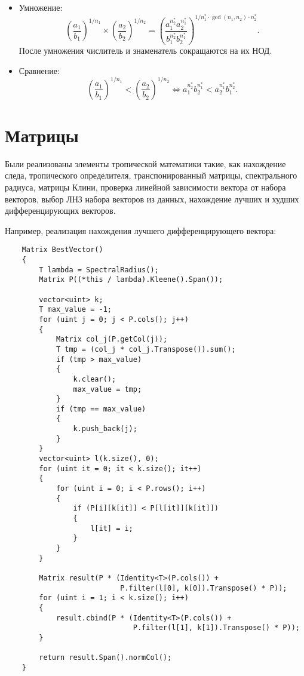 \documentclass[specialist, substylefile = spbureport.rtx,
    subf,href,colorlinks=true, 12pt]{disser}
\begin{document}
    \begin{itemize}
        \item Умножение:
        $$ \left(\frac{a_1}{b_1}\right)^{1/n_1} \times \left(\frac{a_2}{b_2}\right)^{1/n_2} = \left(\frac{a_1^{n^*_2}a_2^{n^*_1}}{b_1^{n^*_2}b_2^{n^*_1}}\right)^{1/n^*_1\cdot \gcd(n_1, n_2) \cdot n^*_2}.$$
        После умножения числитель и знаменатель сокращаются на их НОД.
        \item Сравнение:
        $$ \left(\frac{a_1}{b_1}\right)^{1/n_1} < \left(\frac{a_2}{b_2}\right)^{1/n_2} \Leftrightarrow
        {a_1^{n^*_2}}{b_2^{n^*_1}} < {a_2^{n^*_1}}{b_1^{n^*_2}}.$$
    \end{itemize}

    




    \section{Матрицы}
    Были реализованы элементы тропической математики такие, как нахождение следа, тропического определителя, транспонированный матрицы, спектрального радиуса, матрицы Клини, проверка линейной зависимости вектора от набора векторов, выбор ЛНЗ набора векторов из данных, нахождение лучших и худших дифференцирующих векторов.


    Например, реализация нахождения лучшего дифференцирующего вектора:
    \begin{lstlisting}
    Matrix BestVector()
    {
        T lambda = SpectralRadius();
        Matrix P((*this / lambda).Kleene().Span());

        vector<uint> k;
        T max_value = -1;
        for (uint j = 0; j < P.cols(); j++)
        {
            Matrix col_j(P.getCol(j));
            T tmp = (col_j * col_j.Transpose()).sum();
            if (tmp > max_value)
            {
                k.clear();
                max_value = tmp;
            }
            if (tmp == max_value)
            {
                k.push_back(j);
            }
        }
        vector<uint> l(k.size(), 0);
        for (uint it = 0; it < k.size(); it++)
        {
            for (uint i = 0; i < P.rows(); i++)
            {
                if (P[i][k[it]] < P[l[it]][k[it]])
                {
                    l[it] = i;
                }
            }
        }

        Matrix result(P * (Identity<T>(P.cols()) +
                           P.filter(l[0], k[0]).Transpose() * P));
        for (uint i = 1; i < k.size(); i++)
        {
            result.cbind(P * (Identity<T>(P.cols()) +
                              P.filter(l[1], k[1]).Transpose() * P));
        }

        return result.Span().normCol();
    }
    \end{lstlisting}
\end{document}
